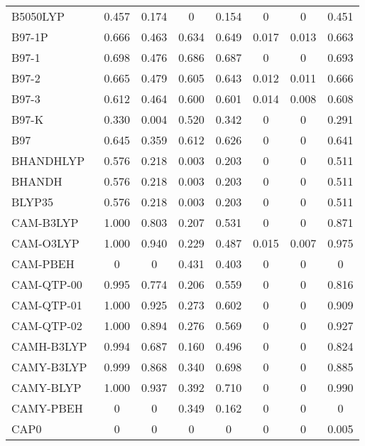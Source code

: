 \begin{table*}
\begin{tabular}{|l|c|c|c|c|c|c|c|}
B5050LYP~\cite{Shao2003_4807} & 0.457 & 0.174 & 0 & 0.154 & 0 & 0 & 0.451 \\
B97-1P~\cite{Cohen2000_160} & 0.666 & 0.463 & 0.634 & 0.649 & 0.017 & 0.013 & 0.663 \\
B97-1~\cite{Hamprecht1998_6264} & 0.698 & 0.476 & 0.686 & 0.687 & 0 & 0 & 0.693 \\
B97-2~\cite{Wilson2001_9233} & 0.665 & 0.479 & 0.605 & 0.643 & 0.012 & 0.011 & 0.666 \\
B97-3~\cite{Keal2005_121103} & 0.612 & 0.464 & 0.600 & 0.601 & 0.014 & 0.008 & 0.608 \\
B97-K~\cite{Boese2004_3405} & 0.330 & 0.004 & 0.520 & 0.342 & 0 & 0 & 0.291 \\
B97~\cite{Becke1997_8554} & 0.645 & 0.359 & 0.612 & 0.626 & 0 & 0 & 0.641 \\
BHANDHLYP~\cite{Becke1993_1372,gaussianimplementation} & 0.576 & 0.218 & 0.003 & 0.203 & 0 & 0 & 0.511 \\
BHANDH~\cite{Becke1993_1372,gaussianimplementation} & 0.576 & 0.218 & 0.003 & 0.203 & 0 & 0 & 0.511 \\
BLYP35~\cite{Renz2009_16292,Kaupp2011_16973} & 0.576 & 0.218 & 0.003 & 0.203 & 0 & 0 & 0.511 \\
CAM-B3LYP~\cite{Yanai2004_51} & 1.000 & 0.803 & 0.207 & 0.531 & 0 & 0 & 0.871 \\
CAM-O3LYP~\cite{Bircher2018_3184} & 1.000 & 0.940 & 0.229 & 0.487 & 0.015 & 0.007 & 0.975 \\
CAM-PBEH~\cite{Chen2018_073803} & 0 & 0 & 0.431 & 0.403 & 0 & 0 & 0 \\
CAM-QTP-00~\cite{Verma2014_18A534} & 0.995 & 0.774 & 0.206 & 0.559 & 0 & 0 & 0.816 \\
CAM-QTP-01~\cite{Jin2016_034107} & 1.000 & 0.925 & 0.273 & 0.602 & 0 & 0 & 0.909 \\
CAM-QTP-02~\cite{Haiduke2018_184106} & 1.000 & 0.894 & 0.276 & 0.569 & 0 & 0 & 0.927 \\
CAMH-B3LYP~\cite{Shao2020_587} & 0.994 & 0.687 & 0.160 & 0.496 & 0 & 0 & 0.824 \\
CAMY-B3LYP~\cite{Seth2012_901} & 0.999 & 0.868 & 0.340 & 0.698 & 0 & 0 & 0.885 \\
CAMY-BLYP~\cite{Akinaga2008_348} & 1.000 & 0.937 & 0.392 & 0.710 & 0 & 0 & 0.990 \\
CAMY-PBEH~\cite{Chen2018_073803} & 0 & 0 & 0.349 & 0.162 & 0 & 0 & 0 \\
CAP0~\cite{Carmona2016_120} & 0 & 0 & 0 & 0 & 0 & 0 & 0.005 \\

\end{tabular}
\end{table*}
